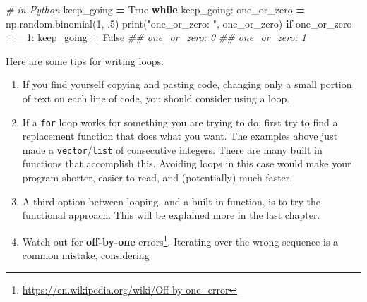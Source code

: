 \documentclass[
  12pt,
  krantz2]{krantz}
\makeatletter
\newenvironment{Shaded}{\begin{snugshade}}{\end{snugshade}}
\newcommand{\BuiltInTok}[1]{#1}
\newcommand{\CommentTok}[1]{\textcolor[rgb]{0.37,0.37,0.37}{\textit{#1}}}
\newcommand{\ControlFlowTok}[1]{\textcolor[rgb]{0.27,0.27,0.27}{\textbf{#1}}}
\newcommand{\DecValTok}[1]{\textcolor[rgb]{0.06,0.06,0.06}{#1}}
\newcommand{\FloatTok}[1]{\textcolor[rgb]{0.06,0.06,0.06}{#1}}
\newcommand{\NormalTok}[1]{#1}
\newcommand{\OperatorTok}[1]{\textcolor[rgb]{0.43,0.43,0.43}{\textbf{#1}}}
\newcommand{\StringTok}[1]{\textcolor[rgb]{0.5,0.5,0.5}{#1}}
\newcommand{\VariableTok}[1]{\textcolor[rgb]{0,0,0}{#1}}
\providecommand{\tightlist}{%
  \setlength{\itemsep}{0pt}\setlength{\parskip}{0pt}}
\renewcommand{\href}[2]{#2\footnote{\url{#1}}}
\newenvironment{kframe}{%
\medskip{}
\setlength{\fboxsep}{.8em}
 \def\at@end@of@kframe{}%
 \ifinner\ifhmode%
  \def\at@end@of@kframe{\end{minipage}}%
  \begin{minipage}{\columnwidth}%
 \fi\fi%
 \def\FrameCommand##1{\hskip\@totalleftmargin \hskip-\fboxsep
 \colorbox{shadecolor}{##1}\hskip-\fboxsep
     \hskip-\linewidth \hskip-\@totalleftmargin \hskip\columnwidth}%
 \MakeFramed {\advance\hsize-\width
   \@totalleftmargin\z@ \linewidth\hsize
   \@setminipage}}%
 {\par\unskip\endMakeFramed%
 \at@end@of@kframe}
\renewenvironment{Shaded}{\begin{kframe}}{\end{kframe}}
\newenvironment{rmd-caution}{\begin{lrbox}{\rmdbox}
  \minipage[c]{\dimexpr \textwidth-2\fboxrule-\wd\excl-\columnsep}
    \vspace*{\columnsep}}%
{\vspace*{\columnsep}\endminipage\end{lrbox}%
  {\par\color{yellow}\fboxsep=0pt
    \fbox{\usebox\excl\usebox\rmdbox\hspace{\columnsep}}\par}}
\makeatother
\begin{document}
\begin{Shaded}
\begin{Highlighting}[]
\CommentTok{\# in Python}
\NormalTok{keep\_going }\OperatorTok{=} \VariableTok{True}
\ControlFlowTok{while}\NormalTok{ keep\_going:}
\NormalTok{    one\_or\_zero }\OperatorTok{=}\NormalTok{ np.random.binomial(}\DecValTok{1}\NormalTok{, }\FloatTok{.5}\NormalTok{) }
    \BuiltInTok{print}\NormalTok{(}\StringTok{"one\_or\_zero: "}\NormalTok{, one\_or\_zero)}
    \ControlFlowTok{if}\NormalTok{ one\_or\_zero }\OperatorTok{==} \DecValTok{1}\NormalTok{:}
\NormalTok{        keep\_going }\OperatorTok{=} \VariableTok{False}
\CommentTok{\#\# one\_or\_zero:  0}
\CommentTok{\#\# one\_or\_zero:  1}
\end{Highlighting}
\end{Shaded}

\begin{rmd-caution}

Here are some tips for writing loops:

\begin{enumerate}
\def\labelenumi{\arabic{enumi}.}
\tightlist
\item
  If you find yourself copying and pasting code, changing only a small portion of text on each line of code, you should consider using a loop.
\item
  If a \texttt{for} loop works for something you are trying to do, first try to find a replacement function that does what you want. The examples above just made a \texttt{vector}/\texttt{list} of consecutive integers. There are many built in functions that accomplish this. Avoiding loops in this case would make your program shorter, easier to read, and (potentially) much faster.
\item
  A third option between looping, and a built-in function, is to try the functional approach. This will be explained more in the last chapter.
\item
  Watch out for \href{https://en.wikipedia.org/wiki/Off-by-one_error}{\textbf{off-by-one} errors}. Iterating over the wrong sequence is a common mistake, considering


\end{enumerate}
\end{rmd-caution}
\end{document}
